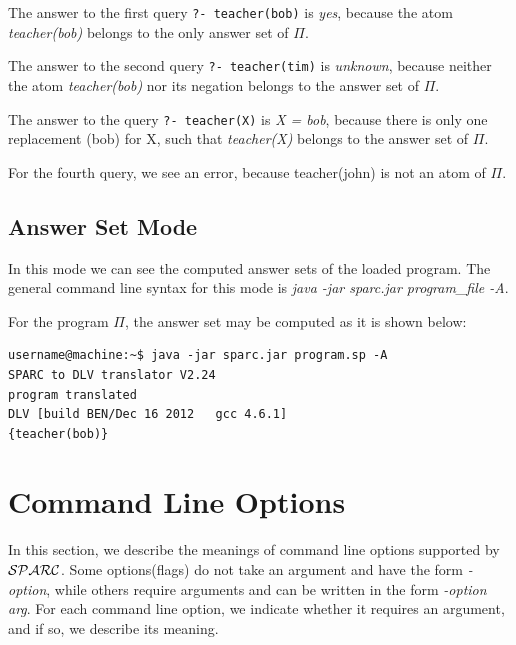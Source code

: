 \documentclass[12pt, letterpaper]{article}
\begin{document}
The answer to the first query \texttt{?- teacher(bob)} is \textit{yes}, because the atom \textit{teacher(bob)} belongs to the only answer set of $\Pi$.

The answer to the second query \texttt{?- teacher(tim)} is \textit{unknown}, because neither the atom \textit{teacher(bob)} nor its negation belongs to the answer set of $\Pi$.

The answer to the query \texttt{?- teacher(X)} is \textit{X = bob}, because there is only one replacement (bob) for X, such that \textit{teacher(X)} belongs to the answer set of $\Pi$.

For the fourth query, we see an error, because teacher(john) is not an atom of $\Pi$.



\subsection{Answer Set Mode}

In this mode we can see the computed answer sets of the loaded program.
The general command line syntax for this mode is \textit{java -jar sparc.jar program\_file -A}.

For the program $\Pi$, the answer set may be computed as it is shown below:
\begin{verbatim}
username@machine:~$ java -jar sparc.jar program.sp -A
SPARC to DLV translator V2.24
program translated
DLV [build BEN/Dec 16 2012   gcc 4.6.1]
{teacher(bob)}

\end{verbatim}


\section{Command Line Options}\label{option}

In this section, we  describe the meanings of command line options supported by
${\cal SPARC}$. Some options(flags) do not take an argument and have the form \textit{-option},
while others require arguments and can be written in the form \textit{-option arg}.
For each command line option, we indicate whether it requires
an argument, and if so, we  describe its meaning.
\end{document}
